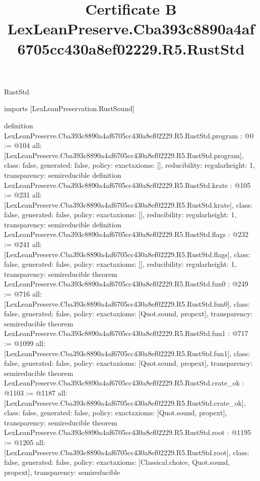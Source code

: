\begin{lexlean}{RustStd}
\title{Certificate B LexLeanPreserve.Cba393c8890a4af6705cc430a8ef02229.R5.RustStd}
\begin{coremodule}
imports [LexLeanPreservation.RustSound]

definition LexLeanPreserve.Cba393c8890a4af6705cc430a8ef02229.R5.RustStd.program : @0 := @104 {
  all: [LexLeanPreserve.Cba393c8890a4af6705cc430a8ef02229.R5.RustStd.program],
  class: false,
  generated: false,
  policy: exact{axioms: []},
  reducibility: regular{height: 1},
  transparency: semireducible
}
definition LexLeanPreserve.Cba393c8890a4af6705cc430a8ef02229.R5.RustStd.krate : @105 := @231 {
  all: [LexLeanPreserve.Cba393c8890a4af6705cc430a8ef02229.R5.RustStd.krate],
  class: false,
  generated: false,
  policy: exact{axioms: []},
  reducibility: regular{height: 1},
  transparency: semireducible
}
definition LexLeanPreserve.Cba393c8890a4af6705cc430a8ef02229.R5.RustStd.flags : @232 := @241 {
  all: [LexLeanPreserve.Cba393c8890a4af6705cc430a8ef02229.R5.RustStd.flags],
  class: false,
  generated: false,
  policy: exact{axioms: []},
  reducibility: regular{height: 1},
  transparency: semireducible
}
theorem LexLeanPreserve.Cba393c8890a4af6705cc430a8ef02229.R5.RustStd.fun0 : @249 := @716 {
  all: [LexLeanPreserve.Cba393c8890a4af6705cc430a8ef02229.R5.RustStd.fun0],
  class: false,
  generated: false,
  policy: exact{axioms: [Quot.sound, propext]},
  transparency: semireducible
}
theorem LexLeanPreserve.Cba393c8890a4af6705cc430a8ef02229.R5.RustStd.fun1 : @717 := @1099 {
  all: [LexLeanPreserve.Cba393c8890a4af6705cc430a8ef02229.R5.RustStd.fun1],
  class: false,
  generated: false,
  policy: exact{axioms: [Quot.sound, propext]},
  transparency: semireducible
}
theorem LexLeanPreserve.Cba393c8890a4af6705cc430a8ef02229.R5.RustStd.crate_ok : @1103 := @1187 {
  all: [LexLeanPreserve.Cba393c8890a4af6705cc430a8ef02229.R5.RustStd.crate_ok],
  class: false,
  generated: false,
  policy: exact{axioms: [Quot.sound, propext]},
  transparency: semireducible
}
theorem LexLeanPreserve.Cba393c8890a4af6705cc430a8ef02229.R5.RustStd.root : @1195 := @1205 {
  all: [LexLeanPreserve.Cba393c8890a4af6705cc430a8ef02229.R5.RustStd.root],
  class: false,
  generated: false,
  policy: exact{axioms: [Classical.choice, Quot.sound, propext]},
  transparency: semireducible
}


\end{coremodule}
\end{lexlean}
